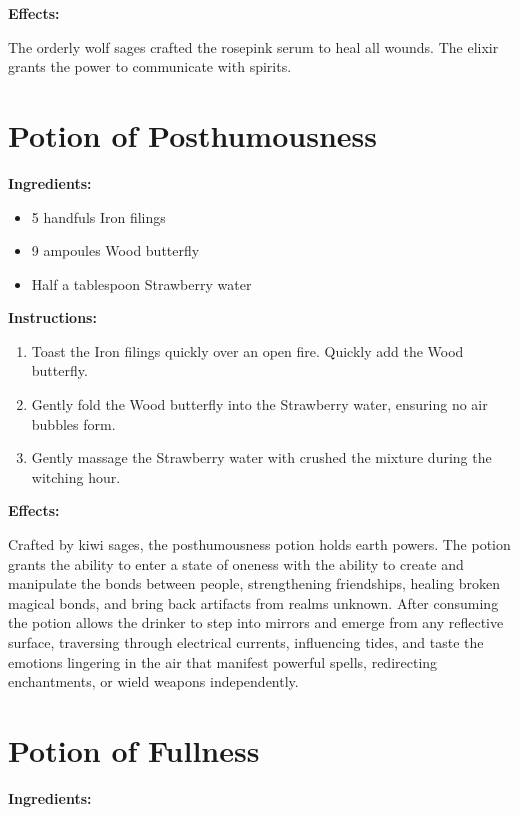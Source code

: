 \documentclass{article}
\begin{document}
\textbf{Effects:}

The orderly wolf sages crafted the rosepink serum to heal all wounds. The elixir grants the power to communicate with spirits.

\newpage
\section*{Potion of Posthumousness}

\textbf{Ingredients:}

\begin{itemize}
  \item 5 handfuls Iron filings
  \item 9 ampoules Wood butterfly
  \item Half a tablespoon Strawberry water
\end{itemize}

\textbf{Instructions:}

\begin{enumerate}
  \item Toast the Iron filings quickly over an open fire. Quickly add the Wood butterfly.
  \item Gently fold the Wood butterfly into the Strawberry water, ensuring no air bubbles form.
  \item Gently massage the Strawberry water with crushed the mixture during the witching hour.
\end{enumerate}

\textbf{Effects:}

Crafted by kiwi sages, the posthumousness potion holds earth powers. The potion grants the ability to enter a state of oneness with the ability to create and manipulate the bonds between people, strengthening friendships, healing broken magical bonds, and bring back artifacts from realms unknown. After consuming the potion allows the drinker to step into mirrors and emerge from any reflective surface, traversing through electrical currents, influencing tides, and taste the emotions lingering in the air that manifest powerful spells, redirecting enchantments, or wield weapons independently.

\newpage
\section*{Potion of Fullness}

\textbf{Ingredients:}
\end{document}
